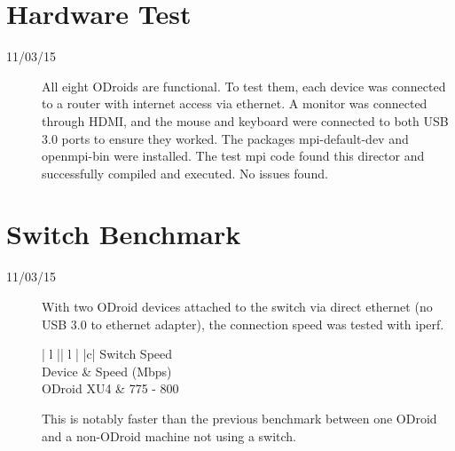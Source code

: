 \section{Hardware Test}
\begin{description}
\item [11/03/15] All eight ODroids are functional. To test them, each device was connected to a router with internet access via ethernet. A monitor was connected through HDMI, and the mouse and keyboard were connected to both USB 3.0 ports to ensure they worked. The packages mpi-default-dev and openmpi-bin were installed. The test mpi code found this director and successfully compiled and executed. No issues found.
\end{description}

\section{Switch Benchmark}
\begin{description}
\item [11/03/15] With two ODroid devices attached to the switch via direct ethernet (no USB 3.0 to ethernet adapter), the connection speed was tested with iperf.

\begin{center}
\begin{tabular}{ | l || l | }
\hline
{}
{ |c| }{ Switch Speed } \\
\hline
Device & Speed (Mbps) \\
\hline
ODroid XU4 & 775 - 800 \\
\hline
\end{tabular}
\end{center}

This is notably faster than the previous benchmark between one ODroid and a non-ODroid machine not using a switch.
\end{description}

